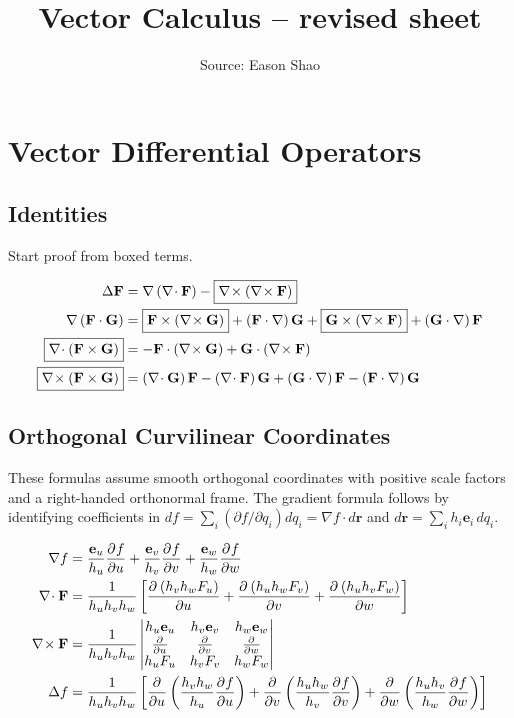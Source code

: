 \documentclass{article}
\title{Vector Calculus -- revised sheet}\author{Source: Eason Shao}\date{}
\theoremstyle{definition}
\theoremstyle{remark}
\newcommand{\mdet}[1]{\begin{vmatrix}#1\end{vmatrix}}
\newcommand{\grad}{\nabla}
\renewcommand{\div}{\nabla\!\cdot}
\newcommand{\curl}{\nabla\!\times}
\newcommand{\laplacian}{\Delta}
\newcommand{\cross}{\times}
\newcommand{\vdot}{\cdot}
\begin{document}
\maketitle



\section*{Vector Differential Operators}

\subsection*{Identities}

Start proof from boxed terms.

\begin{align*}
    \laplacian \vb{F} &= \grad \pqty{\div \vb{F}} - \boxed{\curl \pqty{\curl \vb{F}}} \\
    \grad \pqty{\vb{F} \vdot \vb{G}} &= \boxed{\vb{F} \cross \pqty{\curl \vb{G}}} + \pqty{\vb{F} \vdot \grad} \vb{G} + \boxed{\vb{G} \cross \pqty{\curl \vb{F}}} + \pqty{\vb{G} \vdot \grad} \vb{F} \\
    \boxed{\div \pqty{\vb{F} \cross \vb{G}}} &= - \vb{F} \vdot \pqty{\curl \vb{G}} + \vb{G} \vdot \pqty{\curl \vb{F}} \\
    \boxed{\curl \pqty{\vb{F} \cross \vb{G}}} &= \pqty{\div \vb{G}} \vb{F} - \pqty{\div \vb{F}} \vb{G} + \pqty{\vb{G} \vdot \grad} \vb{F} - \pqty{\vb{F} \vdot \grad} \vb{G}
\end{align*}

\subsection*{Orthogonal Curvilinear Coordinates}
These formulas assume smooth orthogonal coordinates with positive scale factors and a right-handed orthonormal frame. The gradient formula follows by identifying coefficients in $df=\sum_i(\partial f/\partial q_i)dq_i=\nabla f\cdot d\mathbf r$ and $d\mathbf r=\sum_i h_i\mathbf e_i\,dq_i$.


\begin{align*}
    \grad f &= \frac{\vb{e}_u}{h_u} \pdv{f}{u} + \frac{\vb{e}_v}{h_v} \pdv{f}{v} + \frac{\vb{e}_w}{h_w} \pdv{f}{w} \\
    \div \vb{F} &= \frac{1}{h_u h_v h_w} \bqty{\pdv{\pqty{h_v h_w F_u}}{u} + \pdv{\pqty{h_u h_w F_v}}{v} + \pdv{\pqty{h_u h_v F_w}}{w}} \\
    \curl \vb{F} &= \frac{1}{h_u h_v h_w} \mdet{
        h_u \vb{e}_u & h_v \vb{e}_v & h_w \vb{e}_w \\
        \pdv{u} & \pdv{v} & \pdv{w} \\
        h_u F_u & h_v F_v & h_w F_w} \\
    \laplacian f &= \frac{1}{h_u h_v h_w} \bqty{\pdv{u} \pqty{\frac{h_v h_w}{h_u} \pdv{f}{u}} + \pdv{v} \pqty{\frac{h_u h_w}{h_v} \pdv{f}{v}} + \pdv{w} \pqty{\frac{h_u h_v}{h_w} \pdv{f}{w}}}
\end{align*}
\end{document}
